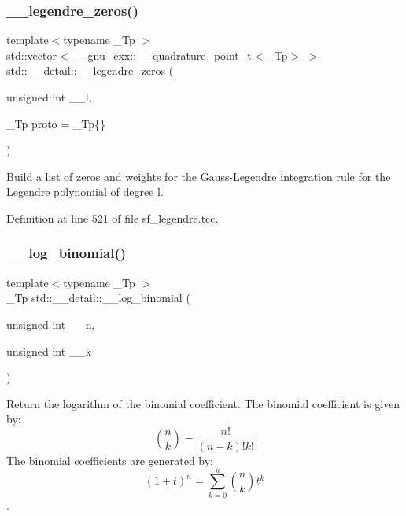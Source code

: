 \subsubsection{\texorpdfstring{\+\_\+\+\_\+legendre\+\_\+zeros()}{\_\_legendre\_zeros()}}
{\footnotesize\ttfamily template$<$typename \+\_\+\+Tp $>$ \\
std\+::vector$<$\hyperlink{struct____gnu__cxx_1_1____quadrature__point__t}{\+\_\+\+\_\+gnu\+\_\+cxx\+::\+\_\+\+\_\+quadrature\+\_\+point\+\_\+t}$<$\+\_\+\+Tp$>$ $>$ std\+::\+\_\+\+\_\+detail\+::\+\_\+\+\_\+legendre\+\_\+zeros (\begin{DoxyParamCaption}\item[{unsigned int}]{\+\_\+\+\_\+l,  }\item[{\+\_\+\+Tp}]{proto = {\ttfamily \+\_\+Tp\{\}} }\end{DoxyParamCaption})}

Build a list of zeros and weights for the Gauss-\/\+Legendre integration rule for the Legendre polynomial of degree {\ttfamily l}. 

Definition at line 521 of file sf\+\_\+legendre.\+tcc.

\mbox{\label{namespacestd_1_1____detail_a087d65f98ba6a6709b4d62fa32445e59}} 
\subsubsection{\texorpdfstring{\+\_\+\+\_\+log\+\_\+binomial()}{\_\_log\_binomial()}\hspace{0.1cm}{\footnotesize\ttfamily [1/2]}}
{\footnotesize\ttfamily template$<$typename \+\_\+\+Tp $>$ \\
\+\_\+\+Tp std\+::\+\_\+\+\_\+detail\+::\+\_\+\+\_\+log\+\_\+binomial (\begin{DoxyParamCaption}\item[{unsigned int}]{\+\_\+\+\_\+n,  }\item[{unsigned int}]{\+\_\+\+\_\+k }\end{DoxyParamCaption})}



Return the logarithm of the binomial coefficient. The binomial coefficient is given by\+: \[ \binom{n}{k} = \frac{n!}{(n-k)! k!} \] The binomial coefficients are generated by\+: \[ \left(1 + t\right)^n = \sum_{k=0}^n \binom{n}{k} t^k \]. 


